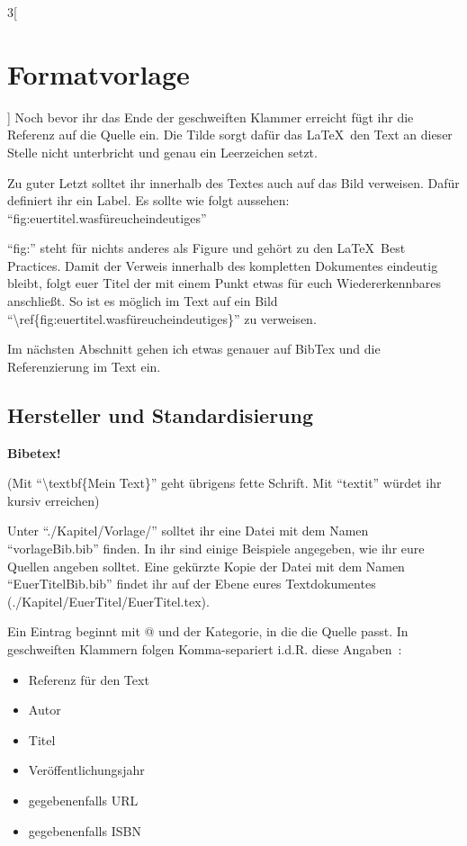 \begin{multicols}{3}[\section{Formatvorlage}]
Noch bevor ihr das Ende der geschweiften Klammer erreicht fügt ihr die Referenz auf die Quelle ein. Die Tilde sorgt dafür das \LaTeX~den Text an dieser Stelle nicht unterbricht und genau ein Leerzeichen setzt. 

Zu guter Letzt solltet ihr innerhalb des Textes auch auf das Bild verweisen. Dafür definiert ihr ein Label. Es sollte wie folgt aussehen: \enquote{fig:euertitel.wasfüreucheindeutiges}

\enquote{fig:} steht für nichts anderes als Figure und gehört zu den \LaTeX~Best Practices. Damit der Verweis innerhalb des kompletten Dokumentes eindeutig bleibt, folgt euer Titel der mit einem Punkt etwas für euch Wiedererkennbares anschließt. So ist es möglich im Text auf ein Bild \enquote{\textbackslash ref\{fig:euertitel.wasfüreucheindeutiges\}} zu verweisen. 

Im nächsten Abschnitt gehen ich etwas genauer auf BibTex und die Referenzierung im Text ein.

\subsection*{Hersteller und Standardisierung}
\textbf{Bibetex!} 

(Mit \enquote{\textbackslash textbf\{Mein Text\}} geht übrigens fette Schrift. Mit \enquote{textit} würdet ihr kursiv erreichen)

Unter \enquote{./Kapitel/Vorlage/} solltet ihr eine Datei mit dem Namen \enquote{vorlageBib.bib} finden. In ihr sind einige Beispiele angegeben, wie ihr eure Quellen angeben solltet. Eine gekürzte Kopie der Datei mit dem Namen \enquote{EuerTitelBib.bib} findet ihr auf der Ebene eures Textdokumentes (./Kapitel/EuerTitel/EuerTitel.tex).

Ein Eintrag beginnt mit @ und der Kategorie, in die die Quelle passt. In geschweiften Klammern folgen Komma-separiert i.d.R. diese Angaben~\cite{vorlage.2}:

\begin{itemize}
	\item Referenz für den Text
	\item Autor 
	\item Titel
	\item Veröffentlichungsjahr
	\item gegebenenfalls URL
	\item gegebenenfalls ISBN
\end{itemize}

\end{multicols}
\newpage
